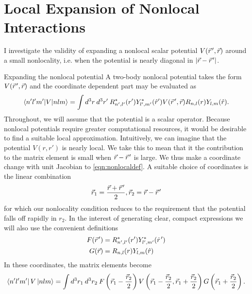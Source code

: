

\chapter{Local Expansion of Nonlocal Interactions}


I investigate the validity of expanding a nonlocal scalar potential $V(\vec{r}\mkern2mu',\vec{r})$ around a small nonlocality, i.e. when the potential is nearly diagonal in $|\vec{r}-\vec{r}\mkern2mu'|$. 


\begin{section}{Expanding the nonlocal potential}
A two-body nonlocal potential takes the form $V(\vec{r}\mkern2mu',\vec{r})$ and the coordinate dependent part may be evaluated as
\begin{equation}\label{eqn:nonlocaldef}
\braket{n' l' m'| V | n l m}=\int d^3r\:d^3r'\:R^*_{n',l'}(r') Y^*_{l',m'}(\hat{r}') V(\vec{r}\mkern2mu',\vec{r}) R_{n,l}(r) Y_{l,m}(\hat{r}).
\end{equation}
Throughout, we will assume that the potential is a scalar operator. Because nonlocal potentials require greater computational resources, it would be desirable to find a suitable local approximation. Intuitively, we can imagine that the potential $V(r,r')$ is nearly local. We take this to mean that it the contribution to the matrix element is small when $\vec{r}-\vec{r}\mkern2mu'$ is large. We thus make a coordinate change with unit Jacobian to \eqref{eqn:nonlocaldef}. A suitable choice of coordinates is the linear combination
\begin{equation}\label{eqn:coords}
\vec{r}_1=\frac{\vec{r}+\vec{r}\mkern2mu'}{2},\vec{r}_2=\vec{r}-\vec{r}\mkern2mu'
\end{equation}
for which our nonlocality condition reduces to the requirement that the potential falls off rapidly in $r_2$. In the interest of generating clear, compact expressions we will also use the convenient definitions
\begin{align}
F(\vec{r}\mkern2mu')&=R^*_{n',l'}(r') Y^*_{l',m'}(\hat{r}\mkern2mu')\\
G(\vec{r})&=R_{n,l}(r) Y_{l,m}(\hat{r})
\end{align}
In these coordinates, the matrix elements become 
\begin{equation}
\bra{n' l' m'} V \ket{ n l m}= \int d^3r_1\:d^3r_2\:F\left( \vec{r}_1-\frac{\vec{r}_2}{2} \right) V\left(\vec{r}_1-\frac{\vec{r}_2}{2},\vec{r}_1+\frac{\vec{r}_2}{2}\right) 
G\left( \vec{r}_1+\frac{\vec{r}_2}{2}\right).
\end{equation}

\end{section}
